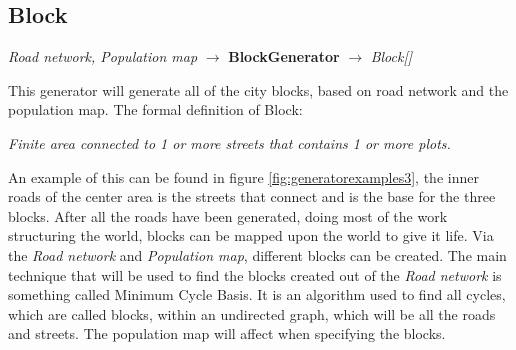 \subsection{Block}
\begin{center}
    \textit{Road network, Population map} $\rightarrow$ \textbf{BlockGenerator} $\rightarrow$ \textit{Block{[}{]}}
\end{center}
This generator will generate all of the city blocks, based on road network and the population map.
The formal definition of Block:
\begin{center}
    \textit{Finite area connected to 1 or more streets that contains 1 or more plots.}
\end{center}
An example of this can be found in figure \ref{fig:generatorexamples3}, the inner roads of the center area is the streets that connect and is the base for the three blocks.
After all the roads have been generated, doing most of the work structuring the world, blocks can be mapped upon the world to give it life.
Via the \textit{Road network} and \textit{Population map}, different blocks can be created. 
The main technique that will be used to find the blocks created out of the \textit{Road network} is something called Minimum Cycle Basis.
It is an algorithm used to find all cycles, which are called blocks, within an undirected graph, which will be all the roads and streets. 
The population map will affect when specifying the blocks. 